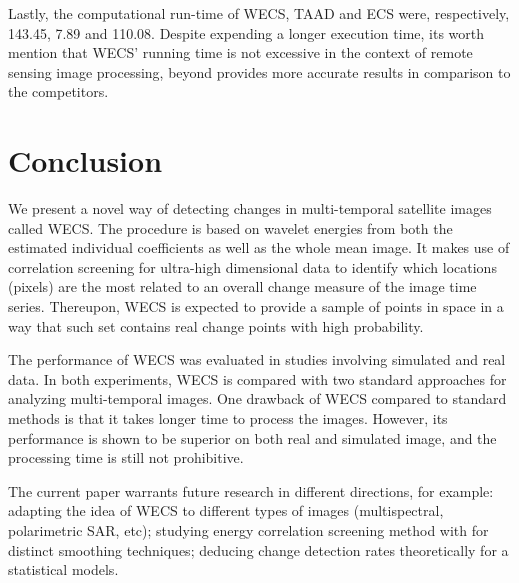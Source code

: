 \documentclass[journal]{IEEEtran}
\begin{document}
Lastly, the computational run-time of WECS, TAAD and ECS were, respectively, \SI{143.45}{\seconds}, \SI{7.89}{\seconds} and \SI{110.08}{\seconds}. Despite expending a longer execution time, its worth mention that WECS' running time is not excessive in the context of remote sensing image processing, beyond provides more accurate results in comparison to the competitors.






\section{Conclusion}\label{section_discussion}



We present a novel way of detecting changes in multi-temporal satellite images called WECS. The procedure is based on wavelet energies from both the estimated individual coefficients as well as the whole mean image. It makes use of correlation screening for ultra-high dimensional data to identify which locations (pixels) are the most related to an overall change measure of the image time series. Thereupon, WECS is expected to provide a sample of points in space in a way that such set contains real change points with high probability. 

The performance of WECS was evaluated in studies involving simulated and real data. In both experiments, WECS is compared with two standard approaches for analyzing multi-temporal images. One drawback of WECS compared to standard methods is that it takes longer time to process the images. However, its performance is shown to be superior on both real and simulated image, and the processing time is still not prohibitive.

The current paper warrants future research in different directions, for example: adapting the idea of WECS to different types of images (multispectral, polarimetric SAR, etc); studying energy correlation screening method with for distinct smoothing techniques; deducing change detection rates theoretically for a statistical models. 




\end{document}

